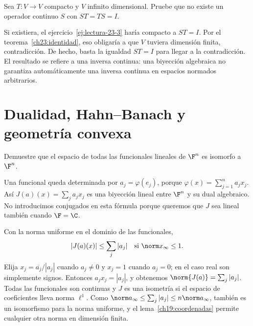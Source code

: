 \begin{ejercicio}\label{ej:lectura-23-4}
Sea $T:V\to V$ compacto y $V$ infinito dimensional. Pruebe que no existe un operador continuo $S$ con $ST=TS=I$.
\end{ejercicio}
\begin{solucion}
Si existiera, el ejercicio~\ref{ej:lectura-23-3} haría compacto a $ST=I$. Por el teorema~\ref{ch23:identidad}, eso obligaría a que $V$ tuviera dimensión finita, contradicción. De hecho, basta la igualdad $ST=I$ para llegar a la contradicción. El resultado se refiere a una inversa continua: una biyección algebraica no garantiza automáticamente una inversa continua en espacios normados arbitrarios.
\end{solucion}

\chapter{Dualidad, Hahn--Banach y geometría convexa}

\begin{ejercicio}\label{ej:lectura-21-1}
Demuestre que el espacio de todas las funcionales lineales de $\F^n$ es isomorfo a $\F^n$.
\end{ejercicio}
\begin{solucion}
Una funcional queda determinada por $a_j=\varphi(e_j)$, porque $\varphi(x)=\sum_{j=1}^n a_jx_j$. Así $J(a)(x)=\sum_j a_jx_j$ es una biyección lineal entre $\F^n$ y su dual algebraico. No introducimos conjugados en esta fórmula porque queremos que $J$ sea lineal también cuando $\F=\C$.

Con la norma uniforme en el dominio de las funcionales,
\[
 |J(a)(x)|\leq\sum_j|a_j|\quad\text{si }\norm x_\infty\leq1.
\]
Elija $x_j=\overline{a_j}/|a_j|$ cuando $a_j\ne0$ y $x_j=1$ cuando $a_j=0$; en el caso real son simplemente signos. Entonces $a_jx_j=|a_j|$, y obtenemos $\norm{J(a)}=\sum_j|a_j|$. Todas las funcionales son continuas y $J$ es una isometría si el espacio de coeficientes lleva norma $\ell^1$. Como $\norm a_\infty\leq\sum_j|a_j|\leq n\norm a_\infty$, también es un isomorfismo para la norma uniforme, y el lema~\ref{ch19:coordenadas} permite cualquier otra norma en dimensión finita.
\end{solucion}

